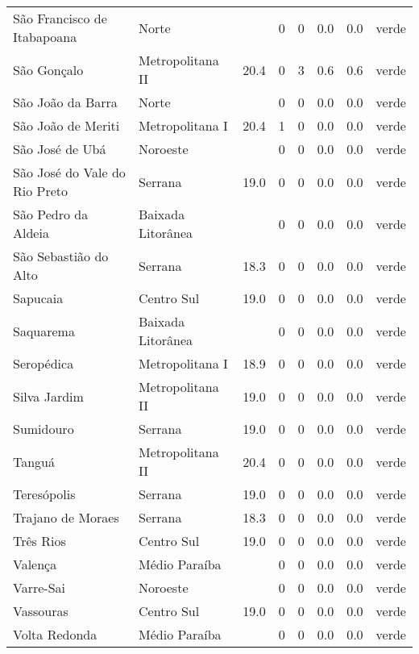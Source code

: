 \begin{longtable}{l|lllllll}
  São Francisco de Itabapoana & Norte &  & 0 & 0 & 0.0 & 0.0 & verde \\ 
  São Gonçalo & Metropolitana II & 20.4 & 0 & 3 & 0.6 & 0.6 & verde \\ 
  São João da Barra & Norte &  & 0 & 0 & 0.0 & 0.0 & verde \\ 
  São João de Meriti & Metropolitana I & 20.4 & 1 & 0 & 0.0 & 0.0 & verde \\ 
  São José de Ubá & Noroeste &  & 0 & 0 & 0.0 & 0.0 & verde \\ 
  São José do Vale do Rio Preto & Serrana & 19.0 & 0 & 0 & 0.0 & 0.0 & verde \\ 
  São Pedro da Aldeia & Baixada Litorânea &  & 0 & 0 & 0.0 & 0.0 & verde \\ 
  São Sebastião do Alto & Serrana & 18.3 & 0 & 0 & 0.0 & 0.0 & verde \\ 
  Sapucaia & Centro Sul & 19.0 & 0 & 0 & 0.0 & 0.0 & verde \\ 
  Saquarema & Baixada Litorânea &  & 0 & 0 & 0.0 & 0.0 & verde \\ 
  Seropédica & Metropolitana I & 18.9 & 0 & 0 & 0.0 & 0.0 & verde \\ 
  Silva Jardim & Metropolitana II & 19.0 & 0 & 0 & 0.0 & 0.0 & verde \\ 
  Sumidouro & Serrana & 19.0 & 0 & 0 & 0.0 & 0.0 & verde \\ 
  Tanguá & Metropolitana II & 20.4 & 0 & 0 & 0.0 & 0.0 & verde \\ 
  Teresópolis & Serrana & 19.0 & 0 & 0 & 0.0 & 0.0 & verde \\ 
  Trajano de Moraes & Serrana & 18.3 & 0 & 0 & 0.0 & 0.0 & verde \\ 
  Três Rios & Centro Sul & 19.0 & 0 & 0 & 0.0 & 0.0 & verde \\ 
  Valença & Médio Paraíba &  & 0 & 0 & 0.0 & 0.0 & verde \\ 
  Varre-Sai & Noroeste &  & 0 & 0 & 0.0 & 0.0 & verde \\ 
  Vassouras & Centro Sul & 19.0 & 0 & 0 & 0.0 & 0.0 & verde \\ 
  Volta Redonda & Médio Paraíba &  & 0 & 0 & 0.0 & 0.0 & verde \\ 
  \hline
\end{longtable}
